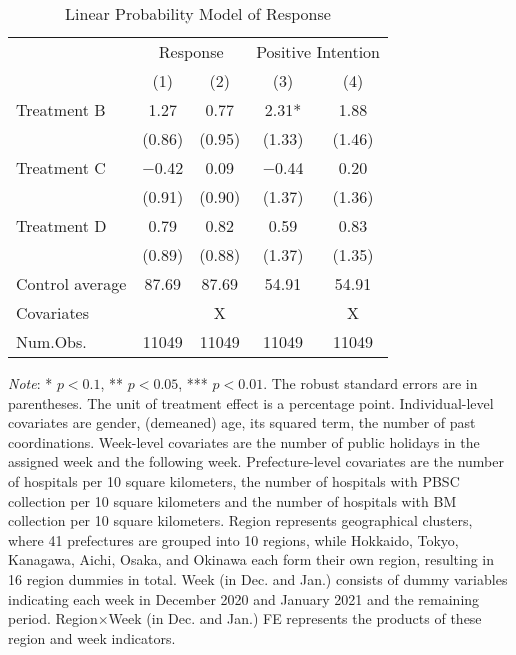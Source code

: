 \documentclass[12pt, a4paper]{article}
\begin{document}
\begin{table}[H]

\caption{\label{tab:reply-lm}Linear Probability Model of Response}
\centering
\fontsize{8}{10}\selectfont
\begin{threeparttable}
\begin{tabular}[t]{lcccc}
\toprule
\multicolumn{1}{c}{ } & \multicolumn{2}{c}{Response} & \multicolumn{2}{c}{Positive Intention} \\
\cmidrule(l{3pt}r{3pt}){2-3} \cmidrule(l{3pt}r{3pt}){4-5}
  & (1) & (2) & (3) & (4)\\
\midrule
Treatment B & \num{1.27} & \num{0.77} & \num{2.31}* & \num{1.88}\\
 & (\num{0.86}) & (\num{0.95}) & (\num{1.33}) & (\num{1.46})\\
Treatment C & \num{-0.42} & \num{0.09} & \num{-0.44} & \num{0.20}\\
 & (\num{0.91}) & (\num{0.90}) & (\num{1.37}) & (\num{1.36})\\
Treatment D & \num{0.79} & \num{0.82} & \num{0.59} & \num{0.83}\\
 & (\num{0.89}) & (\num{0.88}) & (\num{1.37}) & (\num{1.35})\\
\midrule
Control average & 87.69 & 87.69 & 54.91 & 54.91\\
Covariates &  & X &  & X\\
Num.Obs. & \num{11049} & \num{11049} & \num{11049} & \num{11049}\\
\bottomrule
\end{tabular}
\begin{tablenotes}
\item \emph{Note}: * $p < 0.1$, ** $p < 0.05$, *** $p < 0.01$. The robust standard errors are in parentheses. The unit of treatment effect is a percentage point. Individual-level covariates are gender, (demeaned) age, its squared term, the number of past coordinations. Week-level covariates are the number of public holidays in the assigned week and the following week. Prefecture-level covariates are the number of hospitals per 10 square kilometers, the number of hospitals with PBSC collection per 10 square kilometers and the number of hospitals with BM collection per 10 square kilometers. Region represents geographical clusters, where 41 prefectures are grouped into 10 regions, while Hokkaido, Tokyo, Kanagawa, Aichi, Osaka, and Okinawa each form their own region, resulting in 16 region dummies in total. Week (in Dec. and Jan.) consists of dummy variables indicating each week in December 2020 and January 2021 and the remaining period. Region$\times$Week (in Dec. and Jan.) FE represents the products of these region and week indicators.
\end{tablenotes}
\end{threeparttable}
\end{table}
\end{document}
